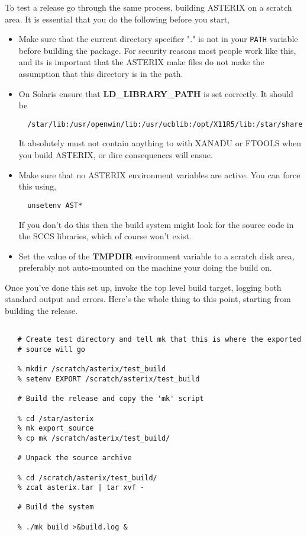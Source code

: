 To test a release go through the same process, building ASTERIX on a 
scratch area. It is essential that you do the following before you start,
\begin{itemize}
\item Make sure that the current directory specifier "." is not in your
  \verb+PATH+ variable before building the package. For security reasons
  most people work like this, and its is important that the ASTERIX make
  files do not make the assumption that this directory is in the path.

\item On Solaris ensure that {\bf LD\_LIBRARY\_PATH} is set correctly.
  It should be 
  \begin{verbatim}
  /star/lib:/usr/openwin/lib:/usr/ucblib:/opt/X11R5/lib:/star/share
  \end{verbatim}
  It absolutely must not contain anything to with XANADU or FTOOLS when
  you build ASTERIX, or dire consequences will ensue.

\item Make sure that no ASTERIX environment variables are active. 
  You can force this using,
  \begin{verbatim}
  unsetenv AST*
  \end{verbatim}
  If you don't do this then the build system might look for the source
  code in the SCCS libraries, which of course won't exist.  

\item Set the value of the {\bf TMPDIR} environment variable to a scratch
  disk area, preferably not auto-mounted on the machine your doing the
  build on.
\end{itemize}
Once you've done this set up, invoke the top level build target, logging
both standard output and errors. Here's the whole thing to this point,
starting from building the release.
\begin{verbatim}

   # Create test directory and tell mk that this is where the exported
   # source will go

   % mkdir /scratch/asterix/test_build
   % setenv EXPORT /scratch/asterix/test_build

   # Build the release and copy the 'mk' script

   % cd /star/asterix
   % mk export_source
   % cp mk /scratch/asterix/test_build/

   # Unpack the source archive

   % cd /scratch/asterix/test_build/
   % zcat asterix.tar | tar xvf -

   # Build the system

   % ./mk build >&build.log &
\end{verbatim}
